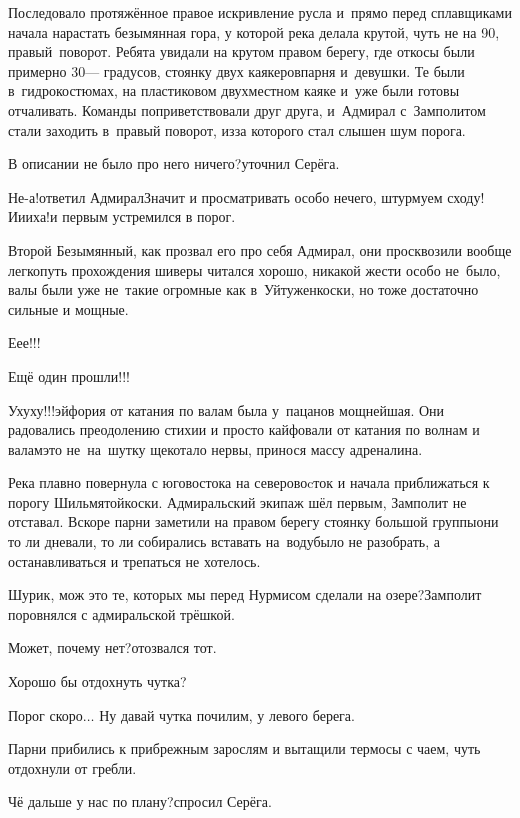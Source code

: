 Последовало протяжённое правое искривление русла и~прямо перед сплавщиками начала нарастать безымянная гора, у которой река делала крутой, чуть не на 90\degree, правый~поворот. Ребята увидали на крутом правом берегу, где откосы были примерно 30\thinspace\nobreakdash--- градусов, стоянку двух каякеров\mdash парня и~девушки. Те были в~гидрокостюмах, на пластиковом двухместном каяке и~уже были готовы отчаливать. Команды поприветствовали друг друга, и~Адмирал с~Замполитом стали заходить в~правый поворот, из\sdash за которого стал слышен шум порога.

\diagdash В описании не было про него ничего?\mdash уточнил Серёга.

\diagdash Не-а!\mdash ответил Адмирал\mdash Значит и просматривать особо нечего, штурмуем сходу! И\sdash и\sdash и\sdash ха!\mdash и первым устремился в порог.

Второй Безымянный, как прозвал его про себя Адмирал, они просквозили вообще легко\mdash путь прохождения шиверы читался хорошо, никакой жести особо не~было, валы были уже не~такие огромные как в~Уйтуженкоски, но тоже достаточно сильные и мощные.

\diagdash Е\sdash е\sdash е!!!

\diagdash Ещё один прошли!!!

\diagdash У\sdash ху\sdash ху!!!\mdash эйфория от катания по валам была у~пацанов мощнейшая. Они радовались преодолению стихии и просто кайфовали от катания по волнам и валам\mdash это не~на~шутку щекотало нервы, принося массу адреналина.

Река плавно повернула с юго\sdash востока на северо\sdash воcток и начала приближаться к порогу Шильмятойкоски. Адмиральский экипаж шёл первым, Замполит не отставал. Вскоре парни заметили на правом берегу стоянку большой группы\mdash они то ли дневали, то ли собирались вставать на~воду\mdash было не разобрать, а останавливаться и трепаться не хотелось.

\diagdash Шурик, мож это те, которых мы перед Нурмисом сделали на озере?\mdash Замполит поровнялся с адмиральской трёшкой.

\diagdash Может, почему нет?\mdash отозвался тот.

\diagdash Хорошо бы отдохнуть чутка?

\diagdash Порог скоро$\ldots$ Ну давай чутка почилим, у левого берега.

Парни прибились к прибрежным зарослям и вытащили термосы с чаем, чуть отдохнули от гребли.

\diagdash Чё дальше у нас по плану?\mdash спросил Серёга.


